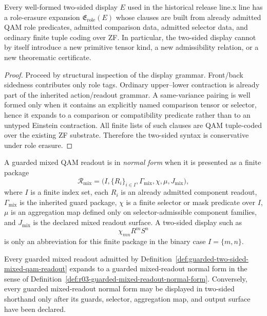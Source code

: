 \begin{proposition}\label{prop:r03-role-erasure-normal-form}
Every well-formed two-sided display \(E\) used in the historical release line.x line has a role-erasure expansion \(\mathfrak{E}_{\mathrm{role}}(E)\) whose clauses are built from already admitted QAM role predicates, admitted comparison data, admitted selector data, and ordinary finite tuple coding over ZF. In particular, the two-sided display cannot by itself introduce a new primitive tensor kind, a new admissibility relation, or a new theorematic certificate.
\end{proposition}

\begin{proof}
Proceed by structural inspection of the display grammar. Front/back sidedness contributes only role tags. Ordinary upper--lower contraction is already part of the inherited action/readout grammar. A same-variance pairing is well formed only when it contains an explicitly named comparison tensor or selector, hence it expands to a comparison or compatibility predicate rather than to an untyped Einstein contraction. All finite lists of such clauses are QAM tuple-coded over the existing ZF substrate. Therefore the two-sided syntax is conservative under role erasure.
\end{proof}

\begin{definition}\label{def:r03-guarded-mixed-readout-normal-form}
A guarded mixed QAM readout is in \emph{normal form} when it is presented as a finite package
\[
\mathcal R_{\mathrm{mix}}
=
\bigl(I,\{R_i\}_{i\in I},\Gamma_{\mathrm{mix}},\chi,\mu,J_{\mathrm{mix}}\bigr),
\]
where \(I\) is a finite index set, each \(R_i\) is an already admitted component readout, \(\Gamma_{\mathrm{mix}}\) is the inherited guard package, \(\chi\) is a finite selector or mask predicate over \(I\), \(\mu\) is an aggregation map defined only on selector-admissible component families, and \(J_{\mathrm{mix}}\) is the declared mixed readout surface. A two-sided display such as
\[
\chi_{mn}R^mS^n
\]
is only an abbreviation for this finite package in the binary case \(I=\{m,n\}\).
\end{definition}

\begin{proposition}\label{prop:r03-mixed-readout-normal-form-expansion}
Every guarded mixed readout admitted by Definition~\ref{def:guarded-two-sided-mixed-qam-readout} expands to a guarded mixed-readout normal form in the sense of Definition~\ref{def:r03-guarded-mixed-readout-normal-form}. Conversely, every guarded mixed-readout normal form may be displayed in two-sided shorthand only after its guards, selector, aggregation map, and output surface have been declared.
\end{proposition}

